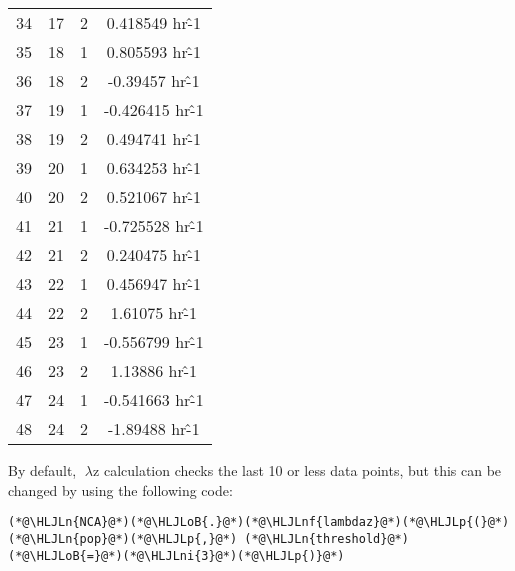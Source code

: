 \documentclass[12pt,a4paper]{article}
\newcommand{\HLJLn}[1]{#1}
\newcommand{\HLJLnf}[1]{\textcolor[RGB]{66,102,213}{#1}}
\newcommand{\HLJLni}[1]{\textcolor[RGB]{59,151,46}{#1}}
\newcommand{\HLJLoB}[1]{\textcolor[RGB]{102,102,102}{\textbf{#1}}}
\newcommand{\HLJLp}[1]{#1}
\begin{document}
\begin{tabular}{r|ccc}
	34 & 17 & 2 & 0.418549 hr\^-1 \\
	35 & 18 & 1 & 0.805593 hr\^-1 \\
	36 & 18 & 2 & -0.39457 hr\^-1 \\
	37 & 19 & 1 & -0.426415 hr\^-1 \\
	38 & 19 & 2 & 0.494741 hr\^-1 \\
	39 & 20 & 1 & 0.634253 hr\^-1 \\
	40 & 20 & 2 & 0.521067 hr\^-1 \\
	41 & 21 & 1 & -0.725528 hr\^-1 \\
	42 & 21 & 2 & 0.240475 hr\^-1 \\
	43 & 22 & 1 & 0.456947 hr\^-1 \\
	44 & 22 & 2 & 1.61075 hr\^-1 \\
	45 & 23 & 1 & -0.556799 hr\^-1 \\
	46 & 23 & 2 & 1.13886 hr\^-1 \\
	47 & 24 & 1 & -0.541663 hr\^-1 \\
	48 & 24 & 2 & -1.89488 hr\^-1 \\
\end{tabular}


By default, \ensuremath{\lambda}z calculation checks the last 10 or less data points, but this can be changed by using the following code:


\begin{lstlisting}
(*@\HLJLn{NCA}@*)(*@\HLJLoB{.}@*)(*@\HLJLnf{lambdaz}@*)(*@\HLJLp{(}@*)(*@\HLJLn{pop}@*)(*@\HLJLp{,}@*) (*@\HLJLn{threshold}@*)(*@\HLJLoB{=}@*)(*@\HLJLni{3}@*)(*@\HLJLp{)}@*)
\end{lstlisting}
\end{document}
